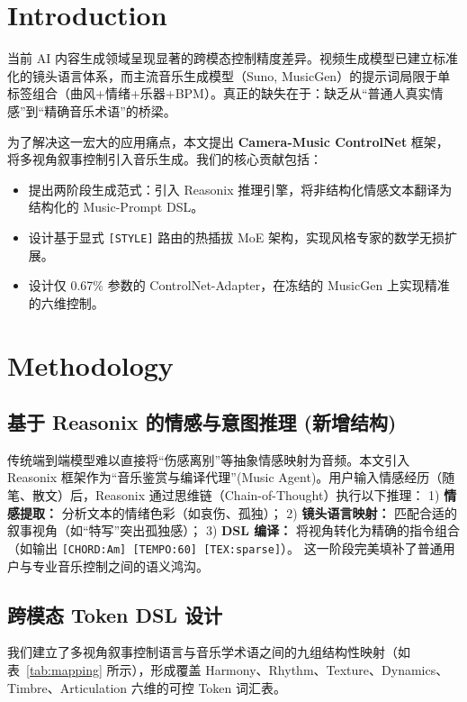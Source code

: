 \documentclass[10pt, conference, letterpaper]{IEEEtran}
\begin{document}
\section{Introduction}
\label{sec:intro}

当前 AI 内容生成领域呈现显著的跨模态控制精度差异。视频生成模型已建立标准化的镜头语言体系，而主流音乐生成模型（Suno, MusicGen）的提示词局限于单标签组合（曲风+情绪+乐器+BPM）。真正的缺失在于：缺乏从“普通人真实情感”到“精确音乐术语”的桥梁。

为了解决这一宏大的应用痛点，本文提出 \textbf{Camera-Music ControlNet} 框架，将多视角叙事控制引入音乐生成。我们的核心贡献包括：
\begin{itemize}
    \item 提出两阶段生成范式：引入 Reasonix 推理引擎，将非结构化情感文本翻译为结构化的 Music-Prompt DSL。
    \item 设计基于显式 \texttt{[STYLE]} 路由的热插拔 MoE 架构，实现风格专家的数学无损扩展。
    \item 设计仅 0.67\% 参数的 ControlNet-Adapter，在冻结的 MusicGen 上实现精准的六维控制。
\end{itemize}

\section{Methodology}
\label{sec:method}

\subsection{基于 Reasonix 的情感与意图推理 (新增结构)}
\label{subsec:reasonix}
传统端到端模型难以直接将“伤感离别”等抽象情感映射为音频。本文引入 Reasonix 框架作为“音乐鉴赏与编译代理”(Music Agent)。用户输入情感经历（随笔、散文）后，Reasonix 通过思维链（Chain-of-Thought）执行以下推理：
1) \textbf{情感提取：} 分析文本的情绪色彩（如哀伤、孤独）；
2) \textbf{镜头语言映射：} 匹配合适的叙事视角（如“特写”突出孤独感）；
3) \textbf{DSL 编译：} 将视角转化为精确的指令组合（如输出 \texttt{[CHORD:Am] [TEMPO:60] [TEX:sparse]}）。
这一阶段完美填补了普通用户与专业音乐控制之间的语义鸿沟。

\subsection{跨模态 Token DSL 设计}
我们建立了多视角叙事控制语言与音乐学术语之间的九组结构性映射（如表~\ref{tab:mapping} 所示），形成覆盖 Harmony、Rhythm、Texture、Dynamics、Timbre、Articulation 六维的可控 Token 词汇表。
\end{document}
